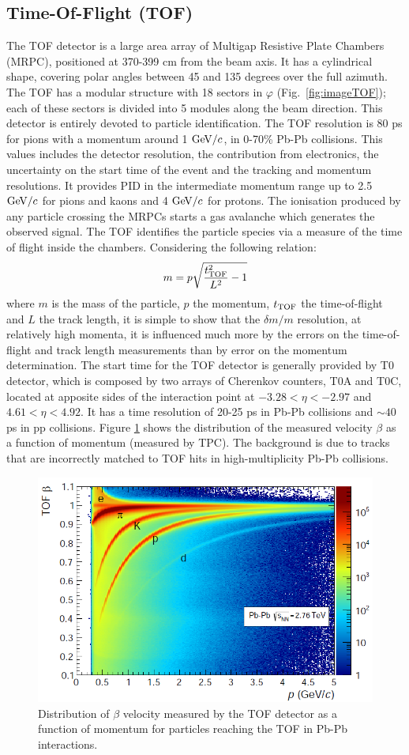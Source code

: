 \subsection{Time-Of-Flight (TOF)}
The TOF detector is a large area array of Multigap Resistive Plate Chambers (MRPC), 
positioned at 370-399 cm from the beam axis. It has a cylindrical 
shape, covering polar angles between 45 and 135 degrees over the full azimuth. 
The TOF has a modular structure with 18 sectors in $\varphi$ (Fig.~\ref{fig:imageTOF}); each 
of these sectors is divided into 5 modules along the beam direction. 
This detector is entirely devoted to particle identification.
The TOF resolution is 80 ps for pions with a momentum around 1 $\mathrm{GeV}/c$, in 0-70\% Pb-Pb collisions.
This values includes the detector resolution, the contribution from electronics, the uncertainty
on the start time of the event and the tracking and momentum resolutions. 
It provides PID in the intermediate momentum range up to 2.5 $\mathrm{GeV}/c$ for pions and kaons and 4 $\mathrm{GeV}/c$ for 
protons. The ionisation produced by any particle crossing the MRPCs starts a gas avalanche 
which generates the observed signal. The TOF identifies the particle species via a measure of the time of flight 
inside the chambers. Considering the following relation:
\[
m = p \sqrt{\frac{t^2_{\rm TOF}}{L^2}-1}
\]
where $m$ is the mass of the particle, $p$ the momentum, $t_{\rm TOF}$ the time-of-flight and 
$L$  the track length, it is simple to show that the $\delta m/m$ resolution, at relatively high
 momenta, it is influenced much more by the errors on the time-of-flight and track length 
 measurements than by error on the momentum determination.
 The start time for the TOF detector is generally provided by T0 detector, which is composed by two arrays of
Cherenkov counters, T0A and T0C, located at apposite sides of the interaction point at 
$-3.28 < \eta < - 2.97$ and $4.61 < \eta < 4.92$. It has a time resolution of 20-25 ps
 in Pb-Pb collisions and $\sim 40$ ps in pp collisions.
Figure \ref{fig:TOFpid} shows the distribution of the measured velocity $\beta$ as a function of momentum (measured by TPC). 
The background is due to tracks that are incorrectly matched to TOF hits in high-multiplicity Pb-Pb collisions.
\begin{figure}[!h]
\centering
\includegraphics[width=.6\textwidth]{FigCap3/TOFpid.png}
\caption{Distribution of $\beta$ velocity measured by the TOF detector as a function of momentum for particles reaching the
TOF in Pb-Pb interactions.}
\label{fig:TOFpid}
\end{figure}

